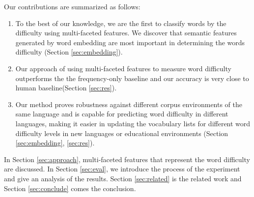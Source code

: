 Our contributions are summarized as follows:
\begin{enumerate}
	\item To the best of our knowledge, we are the first to classify words by the difficulty using multi-faceted features.
	We discover that semantic features generated by word embedding are most important in determining the words difficulty (Section \ref{sec:embedding}).
	\item Our approach of using multi-faceted features to measure word difficulty outperforms the the frequency-only baseline and our accuracy is very close to human baseline(Section \ref{sec:res}).
	\item Our method proves robustness against different corpus environments of the same language and is capable for predicting word difficulty in different languages, making it easier in updating the vocabulary lists for different word difficulty levels in new languages or 
	educational environments (Section \ref{sec:embedding}, \ref{sec:res}).
	
\end{enumerate}

In Section \ref{sec:approach}, multi-faceted features that represent the word difficulty are discussed. 
In Section \ref{sec:eval}, we introduce the process of the experiment and give an analysis of the results.
Section \ref{sec:related} is the related work and Section \ref{sec:conclude} comes the conclusion.